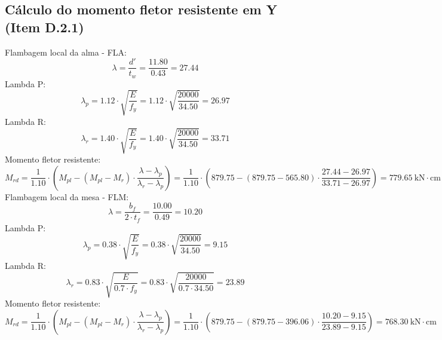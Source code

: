 \documentclass{article}%
\begin{document}
%
\subsection{Cálculo do momento fletor resistente em Y (Item D.2.1)}%
\label{subsec:ClculodomomentofletorresistenteemY(ItemD.2.1)}%
Flambagem local da alma {-} FLA:%
\[%
\lambda = \frac{d'}{t_w} = \frac{11.80}{0.43}  = 27.44 %
\]%
Lambda P:%
\[%
\lambda_p = 1.12 \cdot \sqrt{\frac{E}{f_y}} = 1.12 \cdot \sqrt{\frac{20000}{34.50}} = 26.97%
\]%
Lambda R:%
\[%
\lambda_r = 1.40 \cdot \sqrt{\frac{E}{f_y}} = 1.40 \cdot \sqrt{\frac{20000}{34.50}} = 33.71%
\]%
Momento fletor resistente:%
\[%
M_{rd} = \frac{1}{1.10} \cdot \left( M_{pl} - \left( M_{pl} - M_r \right) \cdot \frac{\lambda - \lambda_p}{\lambda_r - \lambda_p} \right)  = \frac{1}{1.10} \cdot \left( 879.75 - \left( 879.75 - 565.80 \right) \cdot \frac{27.44 - 26.97}{33.71 - 26.97} \right)  = 779.65 \  \text{kN} \cdot \text{cm} %
\]%
Flambagem local da mesa {-} FLM:%
\[%
\lambda = \frac{b_f}{2 \cdot t_f} = \frac{10.00}{0.49}  = 10.20 %
\]%
Lambda P:%
\[%
\lambda_p = 0.38 \cdot \sqrt{\frac{E}{f_y}} = 0.38 \cdot \sqrt{\frac{20000}{34.50}} = 9.15%
\]%
Lambda R:%
\[%
\lambda_r = 0.83 \cdot \sqrt{\frac{E}{0.7 \cdot f_y}} = 0.83 \cdot \sqrt{\frac{20000}{0.7 \cdot 34.50}} = 23.89%
\]%
Momento fletor resistente:%
\[%
M_{rd} = \frac{1}{1.10} \cdot \left( M_{pl} - \left( M_{pl} - M_r \right) \cdot \frac{\lambda - \lambda_p}{\lambda_r - \lambda_p} \right)  = \frac{1}{1.10} \cdot \left( 879.75 - \left( 879.75 - 396.06 \right) \cdot \frac{10.20 - 9.15}{23.89 - 9.15} \right)  = 768.30 \  \text{kN} \cdot \text{cm} %
\]

%
\end{document}
